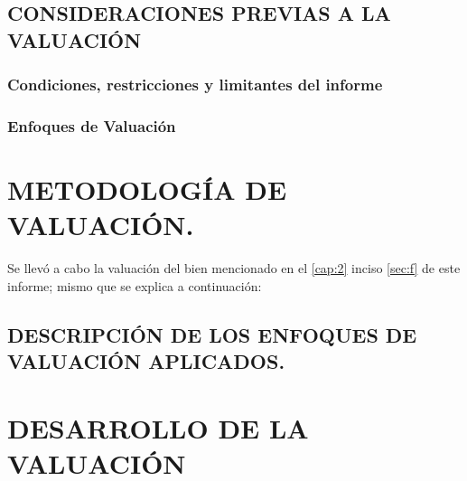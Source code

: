 \documentclass[10pt,letter]{report}
\begin{document}
\section{CONSIDERACIONES PREVIAS A LA VALUACI\'ON}\label{sec:j}

	\subsection{Condiciones, restricciones y limitantes del informe}
	
	
	
	
	\subsection{Enfoques de Valuaci\'on}
	

\espacio{7cm}
%	
%	
	
	
\chapter{METODOLOG\'IA DE VALUACI\'ON.}\label{cap:4}
\thispagestyle{fancy}

Se llev\'o a cabo la valuaci\'on del bien mencionado en el \autoref{cap:2} inciso \autoref{sec:f} de este informe; mismo que se explica a continuaci\'on:

\setcounter{section}{10}
\section{DESCRIPCI\'ON DE LOS ENFOQUES DE VALUACI\'ON APLICADOS.}\label{sec:k}

\renewcommand\thefigure{\arabic{figure}} 





\chapter{DESARROLLO DE LA VALUACI\'ON}\label{cap:5}
\thispagestyle{fancy}
\end{document}
